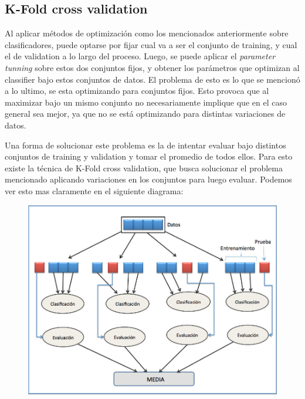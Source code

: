 \documentclass[a4paper]{article}
\begin{document}
    \subsection{K-Fold cross validation}
    Al aplicar métodos de optimización como los mencionados anteriormente sobre clasificadores, puede optarse por fijar cual va a ser el conjunto de training, y cual el de validation a lo largo del proceso. Luego, se puede aplicar el \textit{parameter tunning} sobre estos dos conjuntos fijos, y obtener los parámetros que optimizan al classifier bajo estos conjuntos de datos. El problema de esto es lo que se mencionó a lo ultimo, se esta optimizando para conjuntos fijos. Esto provoca que al maximizar bajo un mismo conjunto no necesariamente implique que en el caso general sea mejor, ya que no se está optimizando para distintas variaciones de datos.
    
    Una forma de solucionar este problema es la de intentar evaluar bajo distintos conjuntos de training y validation y tomar el promedio de todos ellos. Para esto existe la técnica de K-Fold cross validation, que busca solucionar el problema mencionado aplicando variaciones en los conjuntos para luego evaluar. Podemos ver esto mas claramente en el siguiente diagrama:
    
    \begin{figure}[H]
        \begin{center}
            \includegraphics[scale=0.3]{img/explicaciones/k_fold.png}
        \end{center}
    \end{figure}
    
\end{document}

